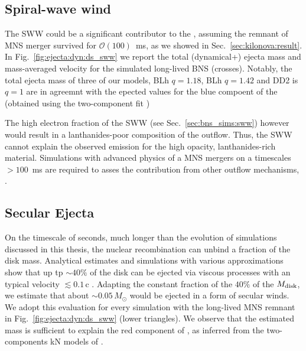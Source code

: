 \subsection{Spiral-wave wind}

The \ac{SWW} could be a significant contributor to the \AT{}, assuming the remnant 
of \GW{} \ac{MNS} merger survived for $\mathcal{O}(100)$~ms, as we showed 
in Sec.~\ref{sec:kilonova:result}.
%
In Fig.~\ref{fig:ejecta:dyn:ds_sww} we report the total (dynamical+\swind{}) ejecta 
mass and mass-averaged velocity for the simulated long-lived \ac{BNS} (crosses).
%
Notably, the total ejecta mass of three of our models, 
BLh $q=1.18$, BLh $q=1.42$ and  DD2 is $q=1$ are in agreemnt with the epected values 
for the blue compoent of the \AT{} 
(obtained using the two-component fit \citep{Villar:2017wcc})

The high electron fraction of the \ac{SWW} (see Sec.~\ref{sec:bns_sims:sww}) 
however would result in a lanthanides-poor composition of the outflow. Thus, the \ac{SWW} 
cannot explain the observed emission for the high opacity, lanthanides-rich material.
%
Simulations with advanced physics of a \ac{MNS} mergers on a timescales $>100$~ms are 
required to asses the contribution from other outflow mechanisms, 
\citep{Lee:2009uc,Fernandez:2015use,Siegel:2017nub,Fujibayashi:2017puw,Fernandez:2018kax,Radice:2018xqa}.


\subsection{Secular Ejecta}

On the timescale of seconds, much longer than the evolution of 
simulations discussed in this thesis, the nuclear recombination can unbind 
a fraction of the disk mass. %
%
Analytical estimates and simulations with various approximations show that up tp ${\sim}40\%$ 
of the disk can be ejected via viscous processes with an typical velocity ${\lesssim}0.1\,$c
\citep{Lee:2009uc,Fernandez:2015use,Wu:2016pnw,Siegel:2017nub,Fujibayashi:2017puw,Fernandez:2018kax,Radice:2018xqa,Fujibayashi:2020dvr}.
%
Adapting the constant fraction of the $40\%$ of the $M_{\rm disk}$, we estimate 
that about ${\sim}0.05\, M_{\odot}$ would be ejected in a form of 
secular winds. We adopt this evaluation for every simulation with the long-lived 
\ac{MNS} remnant in Fig.~\ref{fig:ejecta:dyn:ds_sww} (lower triangles).
%
We observe that the estimated mass is sufficient to explain the red component of 
\AT{}, as inferred from the two-components \ac{kN} models of \citep{Villar:2017wcc}. 








%
%
